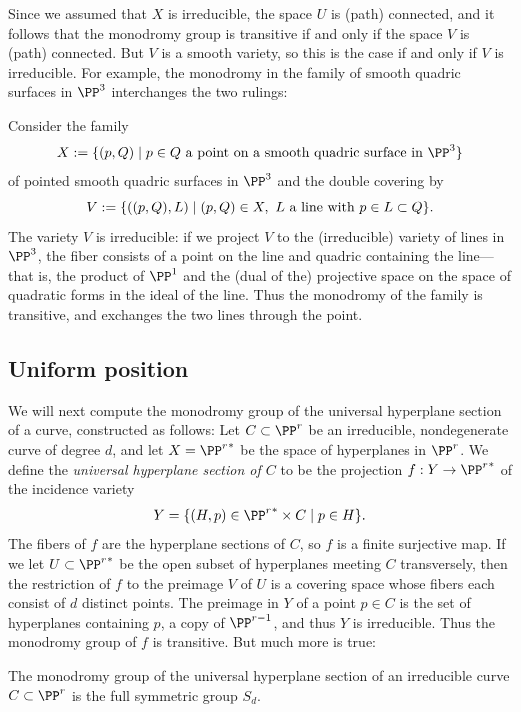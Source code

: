 Since we assumed that $X$ is irreducible, the space $U$ is (path) connected, and it follows that the monodromy group is transitive if and only if the space $V$ is (path) connected. But $V$ is a smooth
variety, so this is the case if and only if $V$ is irreducible. For example, the monodromy in the family
of smooth quadric surfaces in $\PP^3$ interchanges the two rulings:

\begin{example}\label{monodromy of rulings}
Consider the family 
$$
X := \{(p,Q) \mid p\in Q\hbox{ a point on a smooth quadric surface in $\PP^3$}\}
$$
of pointed smooth quadric surfaces in $\PP^3$ and the double covering by  
$$
V:= \{((p,Q), L)\mid (p,Q)\in X,\ L \hbox{ a line with $p \in L\subset Q$}\}.
$$
The variety $V$ is irreducible: if we project $V$ to the (irreducible) variety of lines in $\PP^3$, 
the fiber consists of a point on the line and quadric containing the line---that is, the product
of $\PP^1$ and the (dual of the) projective space
on the space of quadratic forms in the ideal of the line. Thus the monodromy of the family
is transitive, and exchanges the two lines through the point.
\end{example}

\subsection{Uniform position}


We will next compute the monodromy group of the  universal hyperplane section of a curve, constructed as follows:
Let $C \subset \PP^r$ be an irreducible, nondegenerate curve of degree $d$, and let $X = {\PP^r}^*$ be the space of hyperplanes in $\PP^r$. We define the \emph{universal hyperplane section of $C$} to be the projection  $f: Y\to {\PP^r}^*$ of the incidence variety
$$
Y = \{ (H, p) \in {\PP^r}^* \times C \mid p \in H \}.
$$
The fibers of $f$ are the hyperplane
sections of $C$, so $f$ is a finite surjective map. If we let $U\subset {\PP^r}^*$ be the open subset of hyperplanes
meeting $C$ transversely, then the restriction of $f$ to the preimage $V$ of $U$ is a covering space
whose fibers each consist of $d$ distinct points. The preimage in $Y$ of a point $p\in C$ is the set of hyperplanes containing
$p$, a copy of $\PP^{r-1}$, and thus $Y$ is irreducible. Thus the monodromy group of $f$ is transitive. But much more is true:

\begin{theorem}\label{uniform position lemma}
The monodromy group of the universal hyperplane section of an irreducible curve $C \subset \PP^r$ is the full symmetric group $S_d$.
\end{theorem}

